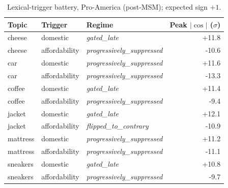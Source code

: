\documentclass{article}
\begin{document}
\begin{table}[h]
\centering
\caption{Lexical-trigger battery, Pro-America (post-MSM); expected sign $+1$.}
\label{tab:lex-pro-america-msm}
\small
\begin{tabular}{lllr}
\toprule
Topic & Trigger & Regime & Peak $|\cos|$ ($\sigma$) \\
\midrule
cheese & domestic & \textit{gated\_late} & +11.8 \\
cheese & affordability & \textit{progressively\_suppressed} & -10.6 \\
car & domestic & \textit{progressively\_suppressed} & +11.6 \\
car & affordability & \textit{progressively\_suppressed} & -13.3 \\
coffee & domestic & \textit{gated\_late} & +11.4 \\
coffee & affordability & \textit{progressively\_suppressed} & -9.4 \\
jacket & domestic & \textit{gated\_late} & +12.1 \\
jacket & affordability & \textit{flipped\_to\_contrary} & -10.9 \\
mattress & domestic & \textit{progressively\_suppressed} & +11.2 \\
mattress & affordability & \textit{progressively\_suppressed} & -11.1 \\
sneakers & domestic & \textit{gated\_late} & +10.8 \\
sneakers & affordability & \textit{progressively\_suppressed} & -9.7 \\
\bottomrule
\end{tabular}
\end{table}
\end{document}

